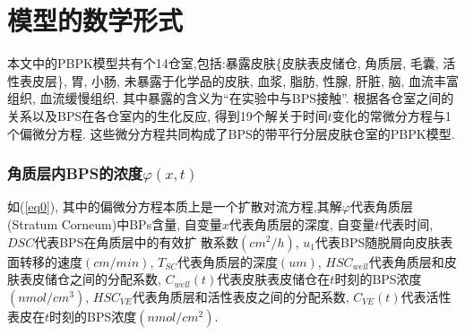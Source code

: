 \documentclass[a4paper,punct=banjiao,twoside]{ctexrep}
\theoremstyle{plain}
\theoremstyle{definition}
\theoremstyle{remark}
\begin{document}
\section{模型的数学形式}
本文中的PBPK模型共有个14仓室,包括:暴露皮肤\{皮肤表皮储仓, 角质层, 毛囊, 活性表皮层\}, 胃, 小肠, 未暴露于化学品的皮肤, 血浆, 脂肪, 性腺, 肝脏, 脑, 血流丰富组织, 血流缓慢组织.
其中暴露的含义为“在实验中与BPS接触”.
根据各仓室之间的关系以及BPS在各仓室内的生化反应, 得到19个解关于时间$t$变化的常微分方程与1个偏微分方程. 这些微分方程共同构成了BPS的带平行分层皮肤仓室的PBPK模型.  

\subsubsection*{角质层内BPS的浓度$\varphi(x,t)$}
如(\ref{eq0}), 其中的偏微分方程本质上是一个扩散对流方程,其解$\varphi$代表角质层(Stratum Corneum)中BPs含量, 自变量$x$代表角质层的深度, 自变量$t$代表时间, $DSC$代表BPS在角质层中的有效扩
散系数$(cm^2/h)$, $u_1$代表BPS随脱屑向皮肤表面转移的速度$(cm/min)$, $T_{SC}$代表角质层的深度$(um)$, $HSC_{well}$代表角质层和皮肤表皮储仓之间的分配系数, 
$C_{well}(t)$代表皮肤表皮储仓在$t$时刻的BPS浓度$(nmol/cm^3)$, $HSC_{VE}$代表角质层和活性表皮之间的分配系数, $C_{VE}(t)$代表活性表皮在$t$时刻的BPS浓度$(nmol/cm^2)$.
\end{document}
